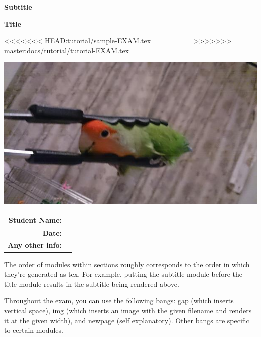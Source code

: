 \documentclass{exam}
\begin{document}
\begin{coverpages}
	\begin{center}
		\vspace{0.05 in}
		\par\noindent\textbf{\large  Subtitle}
		\vspace{0.05 in}
		\vspace{0.10 in}
		\par\noindent\textbf{\Huge   Title}
		\vspace{0.5 in}
		\par\noindent
<<<<<<< HEAD:tutorial/sample-EXAM.tex
=======
		\vspace{0.05 in}
>>>>>>> master:docs/tutorial/tutorial-EXAM.tex
		\par\noindent
				\includegraphics[width=.7\textwidth]{images/tong.jpg}
		\vspace{0.05 in}
		\vspace{0.5 in}
		\vspace{0.10 in}
		\vspace{0.15 in}
		\par
		\def\arraystretch{2}\tabcolsep=3pt
		\begin{tabular}{r r}
			\textbf{Student Name:} & \makebox[4in]{\hrulefill} \\
			\textbf{Date:} & \makebox[4in]{\hrulefill} \\
			\textbf{Any other info:} & \makebox[4in]{\hrulefill} \\
		\end{tabular}
		\vspace{0.15 in}
	\end{center}
		\vspace{0.10 in}
	\par\noindent The order of modules within sections roughly corresponds to the order in which they're generated as tex. For example, putting the subtitle module before the title module results in the subtitle being rendered above.
	\par Throughout the exam, you can use the following bangs: gap (which inserts vertical space), img (which inserts an image with the given filename and renders it at the given width), and newpage (self explanatory). Other bangs are specific to certain modules.

\end{coverpages}
\end{document}
